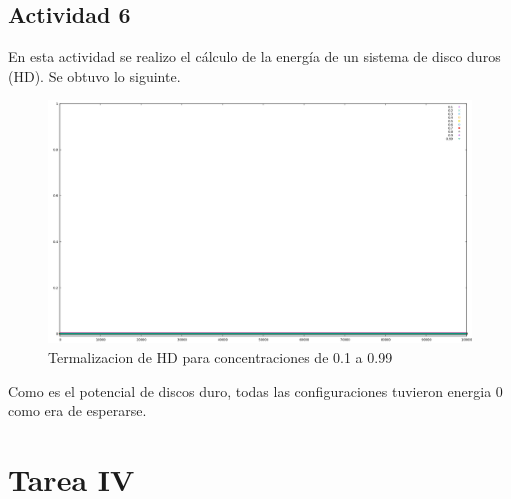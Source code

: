 \documentclass[12pt,letterpaper]{article}
\begin{document}
	\subsection*{Actividad 6}
	En esta actividad se realizo el cálculo de la energía de un sistema de disco duros (HD). Se obtuvo lo siguinte.
	\begin{figure}[H]
		\centering
		\includegraphics[width = 0.75\linewidth]{Terma.png}
		\caption{Termalizacion de HD para concentraciones de 0.1 a 0.99}
	\end{figure}
	Como es el potencial de discos duro, todas las configuraciones tuvieron energia 0 como era de esperarse.
\pagebreak
\section{Tarea IV}
\end{document}
